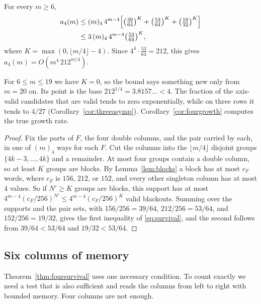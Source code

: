\begin{theorem}\label{thm:foursurvival}
For every $m\ge6$,
\begin{equation}\label{eq:survival}
\begin{split}
a_4(m)&\le(m)_4\,4^{m-4}\Bigl[\bigl(\tfrac{39}{64}\bigr)^K+\bigl(\tfrac{53}{64}\bigr)^K+\bigl(\tfrac{19}{32}\bigr)^K\Bigr]\\
&\le3\,(m)_4\,4^{m-4}\bigl(\tfrac{53}{64}\bigr)^K ,
\end{split}
\end{equation}
where $K=\max(0,\lfloor m/4\rfloor-4)$. Since $4^4\cdot\frac{53}{64}=212$, this gives $a_4(m)=O(m^4\,212^{m/4})$.
\end{theorem}

For $6\le m\le19$ we have $K=0$, so the bound says something new only from $m=20$ on. Its point is the base $212^{1/4}=3.8157\ldots<4$. The fraction of the axis-valid candidates that are valid tends to zero exponentially, while on three rows it tends to $4/27$ (Corollary~\ref{cor:threeasymp}). Corollary~\ref{cor:fourgrowth} computes the true growth rate.

\begin{proof}
Fix the parts of $F$, the four double columns, and the pair carried by each, in one of $(m)_4$ ways for each $F$. Cut the columns into the $\lfloor m/4\rfloor$ disjoint groups $\{4k-3,\ldots,4k\}$ and a remainder. At most four groups contain a double column, so at least $K$ groups are blocks. By Lemma~\ref{lem:blocks} a block has at most $c_F$ words, where $c_F$ is $156$, $212$, or $152$, and every other singleton column has at most $4$ values. So if $N'\ge K$ groups are blocks, this support has at most $4^{m-4}(c_F/256)^{N'}\le4^{m-4}(c_F/256)^K$ valid blackouts. Summing over the supports and the pair sets, with $156/256=39/64$, $212/256=53/64$, and $152/256=19/32$, gives the first inequality of \eqref{eq:survival}, and the second follows from $39/64<53/64$ and $19/32<53/64$.
\end{proof}

\subsection{Six columns of memory}

Theorem~\ref{thm:foursurvival} uses one necessary condition. To count exactly we need a test that is also sufficient and reads the columns from left to right with bounded memory. Four columns are not enough.

